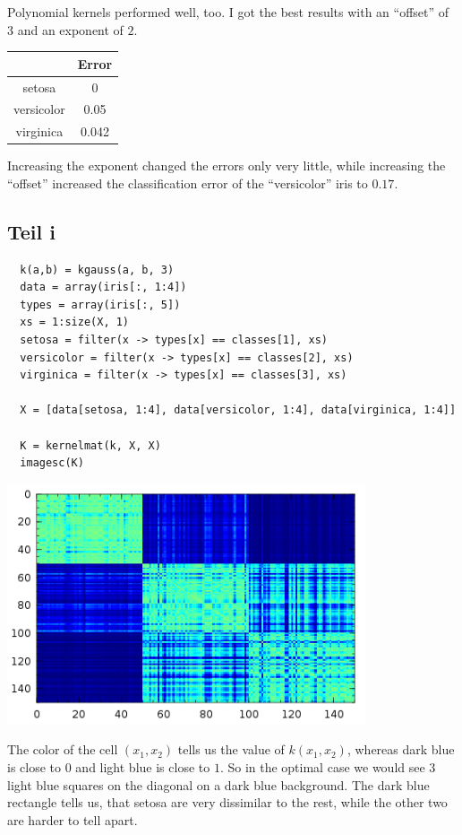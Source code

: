 \documentclass[10pt,a4paper]{article}
\begin{document}
Polynomial kernels performed well, too. I got the best results with an ``offset''
of $3$ and an exponent of $2$.
\begin{tabular}{c|c}
  & Error\\\hline
  setosa & 0 \\\hline
  versicolor & 0.05 \\\hline
  virginica & 0.042
\end{tabular}
Increasing the exponent changed the errors only very little, while increasing
the ``offset'' increased the classification error of the ``versicolor'' iris to
$0.17$.

\subsection{Teil i}

\begin{lstlisting}
  k(a,b) = kgauss(a, b, 3)
  data = array(iris[:, 1:4])
  types = array(iris[:, 5])
  xs = 1:size(X, 1)
  setosa = filter(x -> types[x] == classes[1], xs)
  versicolor = filter(x -> types[x] == classes[2], xs)
  virginica = filter(x -> types[x] == classes[3], xs)

  X = [data[setosa, 1:4], data[versicolor, 1:4], data[virginica, 1:4]]

  K = kernelmat(k, X, X)
  imagesc(K)
\end{lstlisting}

\includegraphics[width=300pt]{6_1_i.png}

The color of the cell $(x_{1}, x_{2})$ tells us the value of $k(x_{1}, x_{2})$,
whereas dark blue is close to $0$ and light blue is close to $1$. So in the
optimal case we would see 3 light blue squares on the diagonal on a dark blue
background. The dark blue rectangle tells us, that setosa are very dissimilar to
the rest, while the other two are harder to tell apart.
\end{document}
